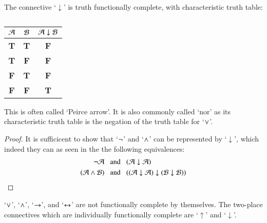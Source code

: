 \begin{definition}
    The connective `$\downarrow$' is truth functionally complete, with characteristic truth table: 
        \begin{table}[H]
            \centering
            \caption{}
            \begin{tabular}{cc|c}
                $\mathcal{A}$ & $\mathcal{B}$ & $\mathcal{A} \downarrow \mathcal{B}$\\ \hline
                \textbf{T} & \textbf{T} & \textbf{F} \\
                \textbf{T} & \textbf{F} & \textbf{F} \\
                \textbf{F} & \textbf{T} & \textbf{F} \\
                \textbf{F} & \textbf{F} & \textbf{T}
            \end{tabular}
        \end{table}
        This is often called `Peirce arrow'. It is also commonly called `nor' as its characteristic truth table is the negation of the truth table for `$\vee$'.
\end{definition}
\begin{proof}
    It is sufficicent to show that `$\neg$' and `$\wedge$' can be represented by `$\downarrow$', which indeed they can as seen in the the following equivalences: 
    \begin{align*}
        \neg\mathcal{A}\;\;&\text{ and }\;\;(\mathcal{A}\downarrow \mathcal{A}) \\
        (\mathcal{A}\wedge\mathcal{B})\;\;&\text{ and }\;\;((\mathcal{A}\downarrow\mathcal{A})\downarrow(\mathcal{B}\downarrow\mathcal{B}))
    \end{align*}
\end{proof}


\begin{theorem}
    `$\vee$', `$\wedge$', `$\rightarrow$', and `$\leftrightarrow$' are not functionally complete by themselves. The  two-place connectives which are individually functionally complete are `$\uparrow$' and `$\downarrow$'.
\end{theorem}

